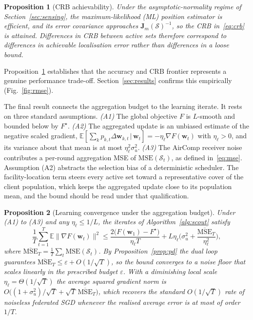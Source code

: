 \documentclass[lettersize,journal]{IEEEtran}
\newtheorem{proposition}{Proposition}
\newcommand{\bw}{\bm{w}}
\newcommand{\bJ}{\bm{J}}
\newcommand{\calS}{\mathcal{S}}
\begin{document}
\begin{proposition}[CRB achievability]\label{prop:crb}
Under the asymptotic-normality regime of Section~\ref{sec:sensing}, the maximum-likelihood (ML) position estimator is efficient, and its error covariance approaches $\bJ_m(\calS)^{-1}$, so the CRB in~\eqref{eq:crb} is attained. Differences in CRB between active sets therefore correspond to differences in achievable localisation error rather than differences in a loose bound.
\end{proposition}

Proposition~\ref{prop:crb} establishes that the accuracy and CRB frontier represents a genuine performance trade-off. Section~\ref{sec:results} confirms this empirically (Fig.~\ref{fig:rmse}).

The final result connects the aggregation budget to the learning iterate. It rests on three standard assumptions. \emph{(A1)} The global objective $F$ is $L$-smooth and bounded below by $F^\star$. \emph{(A2)} The aggregated update is an unbiased estimate of the negative scaled gradient, $\mathbb{E}[\sum_k p_{k,t}\Delta\bw_{k,t}\,|\,\bw_t]=-\eta_\ell\nabla F(\bw_t)$ with $\eta_\ell>0$, and its variance about that mean is at most $\eta_\ell^2\sigma_u^2$. \emph{(A3)} The AirComp receiver noise contributes a per-round aggregation MSE of $\mathrm{MSE}(\calS_t)$, as defined in~\eqref{eq:mse}. Assumption (A2) abstracts the selection bias of a deterministic scheduler. The facility-location term steers every active set toward a representative cover of the client population, which keeps the aggregated update close to its population mean, and the bound should be read under that qualification.

\begin{proposition}[Learning convergence under the aggregation budget]\label{prop:learn}
Under (A1) to (A3) and any $\eta_\ell\le 1/L$, the iterates of Algorithm~\ref{alg:scout} satisfy
\begin{equation}
\frac{1}{T}\sum_{t=1}^{T}\mathbb{E}\big\lVert\nabla F(\bw_t)\big\rVert^{2}
\le\frac{2\big(F(\bw_1)-F^\star\big)}{\eta_\ell T}
+L\eta_\ell\Big(\sigma_u^{2}+\frac{\overline{\mathrm{MSE}}_T}{\eta_\ell^{2}}\Big),
\label{eq:learnbound}
\end{equation}
where $\overline{\mathrm{MSE}}_T=\frac{1}{T}\sum_t\mathrm{MSE}(\calS_t)$. By Proposition~\ref{prop:pd} the dual loop guarantees $\overline{\mathrm{MSE}}_T\le\varepsilon+O(1/\sqrt{T})$, so the bound converges to a noise floor that scales linearly in the prescribed budget $\varepsilon$. With a diminishing local scale $\eta_\ell=\Theta(1/\sqrt{T})$ the average squared gradient norm is $O\big((1+\sigma_u^{2})/\sqrt{T}+\sqrt{T}\,\overline{\mathrm{MSE}}_T\big)$, which recovers the standard $O(1/\sqrt{T})$ rate of noiseless federated SGD whenever the realised average error is at most of order $1/T$.
\end{proposition}
\end{document}
